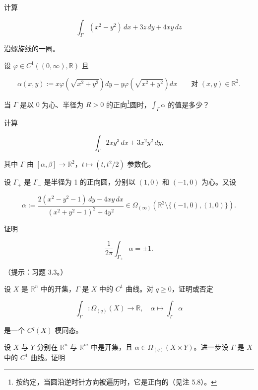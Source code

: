 \begin{exercises}
\item

计算

\[
\int_{\Gamma}(x^{2} - y^{2})\,dx + 3z\,dy + 4xy\,dz
\]

沿螺旋线的一圈。

\item

设 $ \varphi \in C^{1}((0,\infty),\mathbb{R}) $ 且

\[
\alpha(x,y) := x\varphi\left(\sqrt{x^{2} + y^{2}}\right)dy - y\varphi\left(\sqrt{x^{2} + y^{2}}\right)dx \qquad \text{对 } (x,y) \in \mathbb{R}^{2} .
\]

当 $ \Gamma $ 是以 $ 0 $ 为心、半径为 $ R > 0 $ 的正向\footnote{按约定，当圆沿逆时针方向被遍历时，它是正向的（见注 5.8）。}圆时，$ \int_{\Gamma}\alpha $ 的值是多少？

\item

计算

\[
\int_{\Gamma}2xy^{3}\,dx + 3x^{2}y^{2}\,dy ,
\]

其中 $ \Gamma $ 由 $ [\alpha, \beta] \to \mathbb{R}^{2} $，$ t \mapsto (t, t^{2}/2) $ 参数化。

\item

设 $ \Gamma_{+} $ 是 $ \Gamma_{-} $ 是半径为 1 的正向圆，分别以 $ (1,0) $ 和 $ (-1,0) $ 为心。又设

\[
\alpha := \frac{2(x^{2} - y^{2} - 1)\,dy - 4xy\,dx}{(x^{2} + y^{2} - 1)^{2} + 4y^{2}} \in \Omega_{(\infty)}\left(\mathbb{R}^{2}\setminus\{(-1,0),(1,0)\}\right) .
\]

证明

\[
\frac{1}{2\pi}\int_{\Gamma_{\pm}}\alpha = \pm 1 .
\]

（提示：习题 3.3。）

\item

设 $ X $ 是 $ \mathbb{R}^{n} $ 中的开集，$ \Gamma $ 是 $ X $ 中的 $ C^{1} $ 曲线。对 $ q \ge 0 $，证明或否定

\[
\int_{\Gamma} : \Omega_{(q)}(X) \to \mathbb{R} , \quad \alpha \mapsto \int_{\Gamma}\alpha
\]

是一个 $ C^{q}(X) $ 模同态。

\item

设 $ X $ 与 $ Y $ 分别在 $ \mathbb{R}^{n} $ 与 $ \mathbb{R}^{m} $ 中是开集，且 $ \alpha \in \Omega_{(q)}(X\times Y) $。进一步设 $ \Gamma $ 是 $ X $ 中的 $ C^{1} $ 曲线。证明


\end{exercises}
